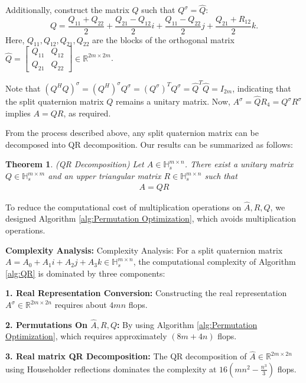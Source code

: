\documentclass[1p]{elsarticle}
\newtheorem{theorem}{Theorem}[section]
\numberwithin{equation}{section}
\begin{document}
Additionally, construct the matrix $Q$ such that $Q^\sigma=\hat{Q}:$
$$
Q = \frac{Q_{11} + Q_{22}}{2} + \frac{Q_{21} - Q_{12}}{2}i + \frac{Q_{11} - Q_{22}}{2}j + \frac{Q_{21} + R_{12}}{2}k.
$$
Here,  $Q_{11}, 
 Q_{12}, Q_{21}, Q_{22}$ are the blocks of the orthogonal matrix $\hat{Q} = \begin{bmatrix} Q_{11} & Q_{12} \\ Q_{21} & Q_{22} \end{bmatrix} \in \mathbb{
 R}^{2m \times 2m}$.

Note that $(Q^H Q)^\sigma = {(Q^H)}^\sigma Q^\sigma = {(Q^\sigma)}^TQ^\sigma = \hat{Q}^T\hat{Q} = I_{2m}$, indicating that the split quaternion matrix $Q$ remains a unitary matrix.
Now, $A^\sigma=\hat{Q}R_4=Q^\sigma R^\sigma$ implies
$A = Q R$, as required.

From the process described above,  any split quaternion matrix can be decomposed into QR decomposition. Our results can be summarized as follows:
\begin{theorem}(QR Decomposition)
    Let $A \in \mathbb{H}_s^{m \times n}$. There exist a unitary matrix $Q \in \mathbb{H}_s^{m \times m}$ and an upper triangular matrix $R \in \mathbb{H}_s^{m \times n}$ such that
    \begin{eqnarray}\label{eq:split QR}
        A = Q R
    \end{eqnarray}
\end{theorem}

To reduce the computational cost of multiplication operations on $\hat{A}, R, Q$, we designed Algorithm \ref{alg:Permutation Optimization}, which avoids multiplication operations.


\textbf{Complexity Analysis:}
{Complexity Analysis:} For a split quaternion matrix $A = A_0 + A_1i + A_2j + A_3k \in \mathbb{H}_s^{m \times n}$, the computational complexity of Algorithm \ref{alg:QR} is dominated by three components:  

\textbf{1. Real Representation Conversion:}
Constructing the real representation $A^\sigma \in \mathbb{R}^{2m \times 2n}$ requires about $4mn$ flops. 

\textbf{2. Permutations On $\hat{A}, R, Q$:}
By using Algorithm \ref{alg:Permutation Optimization},  which requires approximately  $(8m+4n)$ flops.


\textbf{3. Real matrix QR Decomposition:}
The QR decomposition of $\hat{A} \in \mathbb{R}^{2m \times 2n}$ using Householder reflections dominates the complexity at $16(mn^2-\frac{n^3}{3})$ flops.
\end{document}
